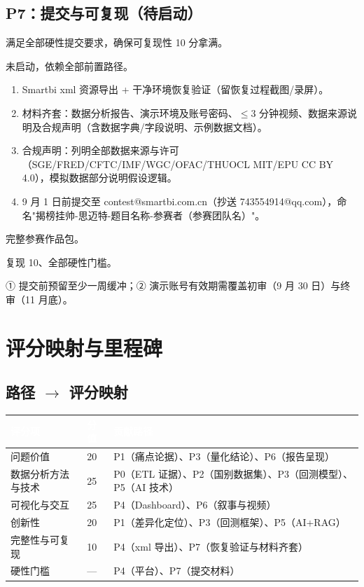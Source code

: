 \documentclass[UTF8,12pt]{ctexart}
\begin{document}
\subsection{P7：提交与可复现（待启动）}

\begin{description}[style=nextline]
\item[目标] 满足全部硬性提交要求，确保可复现性 10 分拿满。
\item[现状] 未启动，依赖全部前置路径。
\item[具体动作]
\begin{enumerate}
\item Smartbi xml 资源导出 + 干净环境恢复验证（留恢复过程截图/录屏）。
\item 材料齐套：数据分析报告、演示环境及账号密码、$\le$3 分钟视频、数据来源说明及合规声明（含数据字典/字段说明、示例数据文档）。
\item 合规声明：列明全部数据来源与许可（SGE/FRED/CFTC/IMF/WGC/OFAC/THUOCL MIT/EPU CC BY 4.0），模拟数据部分说明假设逻辑。
\item 9 月 1 日前提交至 contest@smartbi.com.cn（抄送 743554914@qq.com），命名"揭榜挂帅-思迈特-题目名称-参赛者（参赛团队名）"。
\end{enumerate}
\item[产出物] 完整参赛作品包。
\item[对应评分项] 复现 10、全部硬性门槛。
\item[风险与待决问题] ① 提交前预留至少一周缓冲；② 演示账号有效期需覆盖初审（9 月 30 日）与终审（11 月底）。
\end{description}

\section{评分映射与里程碑}

\subsection{路径 $\to$ 评分映射}

\begin{longtable}{p{3.4cm}p{1.6cm}p{9.2cm}}
\toprule
\rowcolor{navy}\textcolor{white}{\textbf{评分项}} & \textcolor{white}{\textbf{分值}} & \textcolor{white}{\textbf{贡献路径}} \\
\midrule
问题价值 & 20 & P1（痛点论据）、P3（量化结论）、P6（报告呈现） \\
数据分析方法与技术 & 25 & P0（ETL 证据）、P2（国别数据集）、P3（回测模型）、P5（AI 技术） \\
可视化与交互 & 25 & P4（Dashboard）、P6（叙事与视频） \\
创新性 & 20 & P1（差异化定位）、P3（回测框架）、P5（AI+RAG） \\
完整性与可复现 & 10 & P4（xml 导出）、P7（恢复验证与材料齐套） \\
硬性门槛 & --- & P4（平台）、P7（提交材料） \\
\bottomrule
\end{longtable}
\end{document}
